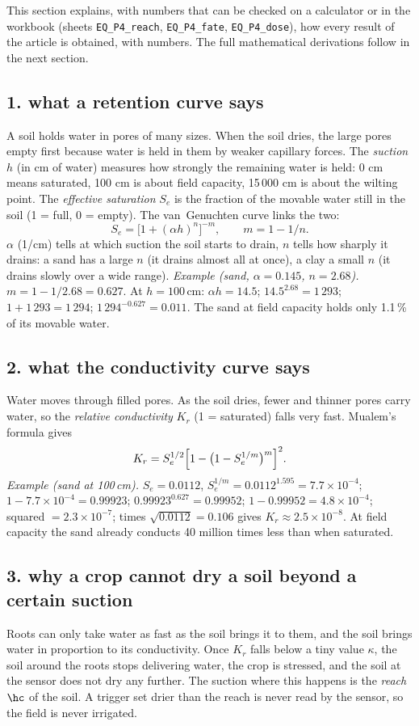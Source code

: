 This section explains, with numbers that can be checked on a calculator or in the workbook (sheets \texttt{EQ\_P4\_reach}, \texttt{EQ\_P4\_fate}, \texttt{EQ\_P4\_dose}), how every result of the article is obtained, with numbers. The full mathematical derivations follow in the next section.

\subsection{1. what a retention curve says}
A soil holds water in pores of many sizes. When the soil dries, the large pores empty first because water is held in them by weaker capillary forces. The \emph{suction} $h$ (in cm of water) measures how strongly the remaining water is held: 0 cm means saturated, 100 cm is about field capacity, 15\,000 cm is about the wilting point. The \emph{effective saturation} $S_e$ is the fraction of the movable water still in the soil (1 = full, 0 = empty). The van~Genuchten curve links the two:
\[S_e=\bigl[1+(\alpha h)^n\bigr]^{-m},\qquad m=1-1/n .\]
$\alpha$ (1/cm) tells at which suction the soil starts to drain, $n$ tells how sharply it drains: a sand has a large $n$ (it drains almost all at once), a clay a small $n$ (it drains slowly over a wide range).
\emph{Example (sand, $\alpha=0.145$, $n=2.68$).} $m=1-1/2.68=0.627$. At $h=100$\,cm: $\alpha h=14.5$; $14.5^{2.68}=1\,293$; $1+1\,293=1\,294$; $1\,294^{-0.627}=0.011$. The sand at field capacity holds only 1.1\,\% of its movable water.

\subsection{2. what the conductivity curve says}
Water moves through filled pores. As the soil dries, fewer and thinner pores carry water, so the \emph{relative conductivity} $K_r$ (1 = saturated) falls very fast. Mualem's formula gives
\[K_r=S_e^{1/2}\Bigl[1-\bigl(1-S_e^{1/m}\bigr)^{m}\Bigr]^{2}.\]
\emph{Example (sand at 100\,cm).} $S_e=0.0112$, $S_e^{1/m}=0.0112^{1.595}=7.7\times10^{-4}$; $1-7.7\times10^{-4}=0.99923$; $0.99923^{0.627}=0.99952$; $1-0.99952=4.8\times10^{-4}$; squared $=2.3\times10^{-7}$; times $\sqrt{0.0112}=0.106$ gives $K_r\approx2.5\times10^{-8}$. At field capacity the sand already conducts 40 million times less than when saturated.

\subsection{3. why a crop cannot dry a soil beyond a certain suction}
Roots can only take water as fast as the soil brings it to them, and the soil brings water in proportion to its conductivity. Once $K_r$ falls below a tiny value $\kappa$, the soil around the roots stops delivering water, the crop is stressed, and the soil at the sensor does not dry any further. The suction where this happens is the \emph{reach} $\hc$ of the soil. A trigger set drier than the reach is never read by the sensor, so the field is never irrigated.

